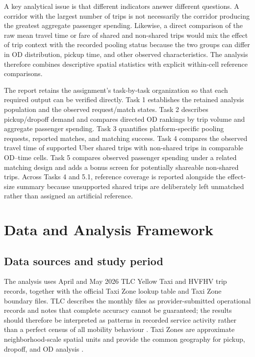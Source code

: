 \documentclass[10pt,a4paper]{article}
\begin{document}
A key analytical issue is that different indicators answer different questions. A corridor with the largest number of trips is not necessarily the corridor producing the greatest aggregate passenger spending. Likewise, a direct comparison of the raw mean travel time or fare of shared and non-shared trips would mix the effect of trip context with the recorded pooling status because the two groups can differ in OD distribution, pickup time, and other observed characteristics. The analysis therefore combines descriptive spatial statistics with explicit within-cell reference comparisons.

The report retains the assignment's task-by-task organization so that each required output can be verified directly. Task 1 establishes the retained analysis population and the observed request/match states. Task 2 describes pickup/dropoff demand and compares directed OD rankings by trip volume and aggregate passenger spending. Task 3 quantifies platform-specific pooling requests, reported matches, and matching success. Task 4 compares the observed travel time of supported Uber shared trips with non-shared trips in comparable OD--time cells. Task 5 compares observed passenger spending under a related matching design and adds a bonus screen for potentially shareable non-shared trips. Across Tasks 4 and 5.1, reference coverage is reported alongside the effect-size summary because unsupported shared trips are deliberately left unmatched rather than assigned an artificial reference.

\section{Data and Analysis Framework}
\subsection{Data sources and study period}
The analysis uses April and May 2026 TLC Yellow Taxi and HVFHV trip records, together with the official Taxi Zone lookup table and Taxi Zone boundary files. TLC describes the monthly files as provider-submitted operational records and notes that complete accuracy cannot be guaranteed; the results should therefore be interpreted as patterns in recorded service activity rather than a perfect census of all mobility behaviour \cite{tlc_tripdata}. Taxi Zones are approximate neighborhood-scale spatial units and provide the common geography for pickup, dropoff, and OD analysis \cite{tlc_zoneguide}.
\end{document}
